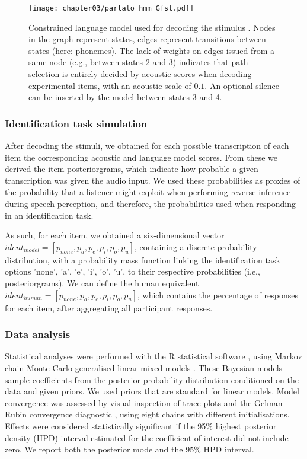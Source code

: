 \begin{figure}[htb]
\centering
\texttt{[image: chapter03/parlato\_hmm\_Gfst.pdf]}
\caption{Constrained language model used for decoding the stimulus . Nodes in the graph represent states, edges represent transitions between states (here: phonemes). The lack of weights on edges issued from a same node (e.g., between states 2 and 3) indicates that path selection is entirely decided by acoustic scores when decoding experimental items, with an acoustic scale of $0.1$. An optional silence can be inserted by the model between states 3 and 4.}
\label{fig:parlato_G}
\end{figure}

\subsubsection{Identification task simulation}
After decoding the stimuli, we obtained for each possible transcription of each item the corresponding acoustic and language model scores. From these we derived the item posteriorgrams, which indicate how probable a given transcription was given the audio input. We used these probabilities as proxies of the probability that a listener might exploit when performing reverse inference during speech perception, and therefore, the probabilities used when responding in an identification task. 

As such, for each item, we obtained a six-dimensional vector $ident_{model} = [p_{none}, p_{a}, p_{e}, p_{i}, p_{o}, p_{u}]$, containing a discrete probability distribution, with a probability mass function linking the identification task options 'none', 'a', 'e', 'i', 'o', 'u', to their respective probabilities (i.e., posteriorgrams).
We can define the human equivalent $ident_{human} = [p_{none}, p_{a}, p_{e}, p_{i}, p_{o}, p_{u}]$, which contains the percentage of responses for each item, after aggregating all participant responses. 

\subsubsection{Data analysis}
Statistical analyses were performed with the R statistical software \cite{R-base}, using Markov chain Monte Carlo generalised linear mixed-models \cite{R-MCMCglmm, R-coda}. These Bayesian models sample coefficients from the posterior probability distribution conditioned on the data and given priors. We used priors that are standard for linear models. Model convergence was assessed by visual inspection of trace plots and the Gelman–Rubin convergence diagnostic \cite{gelman1992}, using eight chains with different initialisations. Effects were considered statistically significant if the 95\% highest posterior density (HPD) interval estimated for the coefficient of interest did not include zero. We report both the posterior mode and the 95\% HPD interval.  

